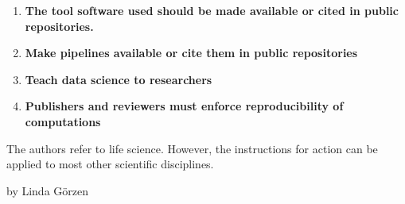 \documentclass{article}
\begin{document}
\begin{enumerate}
\item \textbf{The tool software used should be made available or cited in public repositories.}


\item \textbf{Make pipelines available or cite them in public repositories}


\item \textbf{Teach data science to researchers}


\item \textbf{Publishers and reviewers must enforce reproducibility of computations}


\end{enumerate}

The authors refer to life science. However, the instructions for action can be applied to most other scientific disciplines.





by Linda Görzen





\printbibliography[title={Literaturverzeichnis}]
\end{document}

